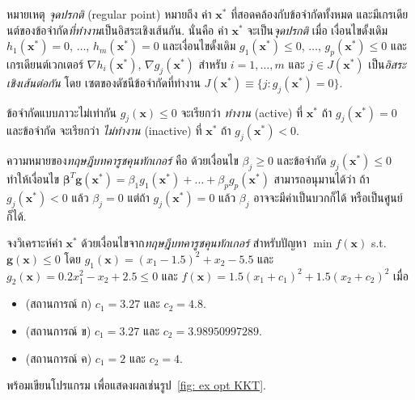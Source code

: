 \begin{Exercise}
หมายเหตุ
\textit{จุดปรกติ} (regular point) หมายถึง 
ค่า $\bm{x}^\ast$ ที่สอดคล้องกับข้อจำกัดทั้งหมด 
และมีเกรเดียนต์ของข้อจำกัด\textit{ที่ทำงาน}เป็นอิสระเชิงเส้นกัน.
นั่นคือ
ค่า $\bm{x}^\ast$ จะเป็น\textit{จุดปรกติ} เมื่อ
เงื่อนไขดั้งเดิม
$h_1(\bm{x}^\ast) = 0$, $\ldots$, $h_m(\bm{x}^\ast) = 0$
และเงื่อนไขดั้งเดิม
$g_1(\bm{x}^\ast) \leq 0$, $\ldots$, $g_p(\bm{x}^\ast) \leq 0$
และเกรเดียนต์เวกเตอร์
$\nabla h_i(\bm{x}^\ast)$, $\nabla g_j(\bm{x}^\ast)$ สำหรับ $i=1, \ldots, m$ และ $j \in J(\bm{x}^\ast)$
เป็น\textit{อิสระเชิงเส้นต่อกัน}
โดย 
เซตของดัชนีข้อจำกัดที่ทำงาน $J(\bm{x}^\ast) \equiv \{j : g_j(\bm{x}^\ast) = 0 \}$.

ข้อจำกัดแบบภาวะไม่เท่ากัน $g_j(\bm{x}) \leq 0$ จะเรียกว่า \textit{ทำงาน} (active) ที่ $\bm{x}^\ast$
ถ้า $g_j(\bm{x}^\ast) = 0$
และข้อจำกัด จะเรียกว่า \textit{ไม่ทำงาน} (inactive) ที่ $\bm{x}^\ast$
ถ้า $g_j(\bm{x}^\ast) < 0$.

ความหมายของ\textit{ทฤษฎีบทคารูชคุนทักเกอร์} คือ
ด้วยเงื่อนไข $\beta_j \geq 0$ และข้อจำกัด $g_j(\bm{x}^\ast) \leq 0$
ทำให้เงื่อนไข $\bm{\beta}^T \bm{g}(\bm{x}^\ast) = \beta_1 g_1(\bm{x}^\ast) + \ldots + \beta_p g_p(\bm{x}^\ast)$
สามารถอนุมานได้ว่า
ถ้า $g_j(\bm{x}^\ast) < 0$ แล้ว $\beta_j = 0$ 
แต่ถ้า $g_j(\bm{x}^\ast) = 0$ แล้ว $\beta_j$ อาจจะมีค่าเป็นบวกก็ได้ หรือเป็นศูนย์ก็ได้. 

จงวิเคราะห์ค่า $\bm{x}^\ast$ ด้วยเงื่อนไขจาก\textit{ทฤษฎีบทคารูชคุนทักเกอร์} สำหรับปัญหา
$\min f(\bm{x})$
s.t.
$\bm{g}(\bm{x}) \leq 0$ 
โดย $g_1(\bm{x})= (x_1 - 1.5)^2 + x_2 - 5.5$
และ
$g_2(\bm{x}) = 0.2 x_1^2 - x_2 + 2.5 \leq 0$
และ
$f(\bm{x}) = 1.5 (x_1 + c_1)^2 + 1.5 (x_2 + c_2)^2$
เมื่อ
\begin{itemize}
	\item (สถานการณ์ ก) $c_1 = 3.27$ และ $c_2 = 4.8$. %
	\item (สถานการณ์ ข) $c_1 = 3.27$ และ $c_2 = 3.98950997289$. %
	\item (สถานการณ์ ค) $c_1 = 2$ และ $c_2 = 4$. %
\end{itemize}
พร้อมเขียนโปรแกรม เพื่อแสดงผลเช่นรูป~\ref{fig: ex opt KKT}. %


\end{Exercise}
